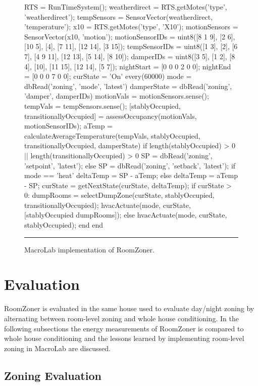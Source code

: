 \begin{figure}
  \begin{macrolab}
RTS = RunTimeSystem();
weatherdirect = RTS.getMotes('type', 'weatherdirect');
tempSensors = SensorVector(weatherdirect, 'temperature');
x10 = RTS.getMotes('type', 'X10');
motionSensors = SensorVector(x10, 'motion');
motionSensorIDs = uint8({[8 1 9], [2 6], [10 5], [4], [7 11], [12 14], [3 15]});
tempSensorIDs = uint8({[1 3], [2], [6 7], [4 9 11], [12 13], [5 14], [8 10]}); 
damperIDs = uint8({[3 5], [1 2], [8 4], [10], [11 15], [12 14], [5 7]});
nightStart = [0 0 0 2 0 0];
nightEnd = [0 0 0 7 0 0];
curState = 'On'
every(60000)
  mode = dbRead('zoning', 'mode', 'latest')
  damperState = dbRead('zoning', 'damper', damperIDs) 
  motionVals = motionSensors.sense();
  tempVals =  tempSensors.sense();
  [stablyOccupied, transitionallyOccupied] = assessOccupancy(motionVals, motionSensorIDs);
  aTemp = calculateAverageTemperature(tempVals, stablyOccupied, transitionallyOccupied, damperState)
  if length(stablyOccupied) > 0 || length(transitionallyOccupied) > 0
    SP = dbRead('zoning', 'setpoint', 'latest');
  else
    SP = dbRead('zoning', 'setback', 'latest');
  if mode == 'heat'
    deltaTemp = SP - aTemp;
  else
    deltaTemp = aTemp - SP;
  curState = getNextState(curState, deltaTemp);
  if curState > 0:
    dumpRooms = selectDumpZone(curState, stablyOccupied, transitionallyOccupied);
    hvacActuate(mode, curState, [stablyOccupied dumpRooms]);
  else
    hvacActuate(mode, curState, stablyOccupied);
  end
end
  \end{macrolab}
  \smallskip
  \hrule width 1\columnwidth
  \caption{MacroLab implementation of RoomZoner.}
  \label{code:cs2}
\end{figure}

\section{Evaluation}

RoomZoner is evaluated in the same house used to evaluate day/night zoning by
alternating between room-level zoning and whole house conditioning. In the
following subsections the energy measurements of RoomZoner is compared to whole
house conditioning and the lessons learned by implementing room-level zoning in
MacroLab are discussed.

\subsection{Zoning Evaluation}

